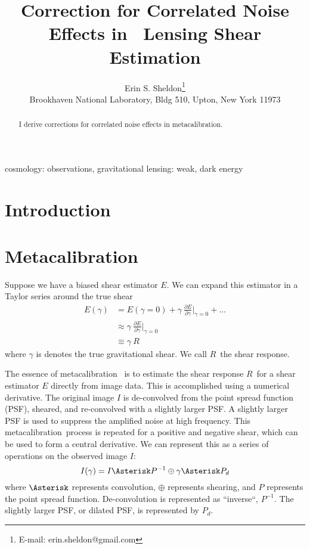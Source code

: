 \documentclass[usegraphicx,usenatbib]{mn2e}
\title{Correction for Correlated Noise Effects in \Mcal\ Lensing Shear Estimation}
\author[Erin S. Sheldon]{Erin S. Sheldon\thanks{E-mail: erin.sheldon@gmail.com}\\
Brookhaven National Laboratory, Bldg 510, Upton, New York 11973}
\newcommand{\mcal}{metacalibration}
\newcommand{\Mcal}{Metacalibration}
\newcommand{\mcalR}{$R$}
\begin{document}
\maketitle

\begin{abstract}

I derive corrections for correlated noise effects in \mcal.   

\end{abstract}


\begin{keywords}                                                                    
    cosmology: observations,
    gravitational lensing: weak,
    dark energy
\end{keywords} 

\section{Introduction} \label{sec:intro}

\section{\Mcal} \label{sec:algo}

Suppose we have a biased shear estimator $E$.  We can expand this estimator
in a Taylor series around the true shear
\begin{align}
    E(\gamma) &= E(\gamma=0) + \gamma ~ \frac{ \partial E }{ \partial \gamma }\bigg|_{\gamma=0}  + ... \nonumber \\
      & \approx  \gamma ~ \frac{ \partial E }{ \partial \gamma } \bigg|_{\gamma=0}  \\
      & \equiv  \gamma ~ \mbox{\mcalR} \nonumber
\end{align}
where $\gamma$ is denotes the true gravitational shear.  We call \mcalR\
the shear response.

The essence of \mcal\ \citep{HuffMcal} is to estimate the shear response
\mcalR\ for a shear estimator $E$ directly from image data.  This is accomplished using
a numerical derivative.  The original image $I$ is de-convolved from the point
spread function (PSF), sheared, and re-convolved with a slightly larger PSF.  A
slightly larger PSF is used to suppress the amplified noise at high
frequency.  This \mcal\ process is repeated for a positive and negative
shear, which can be used to form a central derivative.  We can represent this
as a series of operations on the observed image $I$:
\begin{equation}
    I(\gamma) = I \Asterisk P^{-1} \oplus \gamma \Asterisk P_{d}
\end{equation}
where $\Asterisk$ represents convolution, $\oplus$ represents shearing,
and $P$ represents the point spread function.  De-convolution
is represented as ``inverse``, $P^{-1}$.  The slightly larger PSF, or
dilated PSF, is represented by $P_{d}$.
\end{document}

